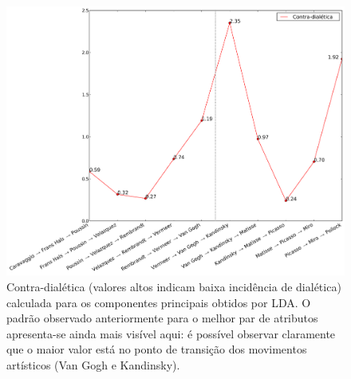 \begin{figure}[h!]
\begin{center}
      \caption{Contra-dialética (valores altos indicam baixa
        incidência de dia\-lé\-ti\-ca) calculada para os componentes principais
        obtidos por LDA. O padrão observado anteriormente para o melhor par de
        atributos apresenta-se ainda mais visível aqui: é possível observar
        claramente que o maior valor está no ponto de transição dos movimentos
        artísticos (Van Gogh e Kandinsky).}
        \label{fig:caso3_dialetica}
        \includegraphics[width=\columnwidth]{figs/caso3_dialetica}
        \fonteminha
\end{center}
\end{figure}


